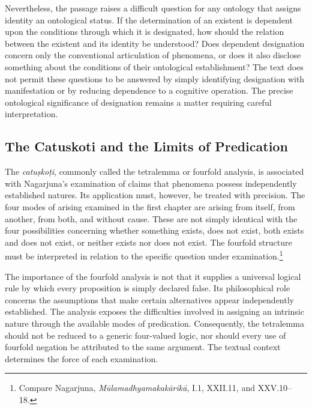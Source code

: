 
\label{para:VS.B01.P01.C08.S18.SS10.P002}
Nevertheless, the passage raises a difficult question for any ontology that assigns identity an ontological status. If the determination of an existent is dependent upon the conditions through which it is designated, how should the relation between the existent and its identity be understood? Does dependent designation concern only the conventional articulation of phenomena, or does it also disclose something about the conditions of their ontological establishment? The text does not permit these questions to be answered by simply identifying designation with manifestation or by reducing dependence to a cognitive operation. The precise ontological significance of designation remains a matter requiring careful interpretation.

\subsection{The Catuskoti and the Limits of Predication}
\label{subsec:ch08_s18_ss11}

\label{para:VS.B01.P01.C08.S18.SS11.P001}
The \emph{catu\d{s}ko\d{t}i}, commonly called the tetralemma or fourfold analysis, is associated with Nagarjuna's examination of claims that phenomena possess independently established natures. Its application must, however, be treated with precision. The four modes of arising examined in the first chapter are arising from itself, from another, from both, and without cause. These are not simply identical with the four possibilities concerning whether something exists, does not exist, both exists and does not exist, or neither exists nor does not exist. The fourfold structure must be interpreted in relation to the specific question under examination.\footnote{Compare Nagarjuna, \emph{M\={u}lamadhyamakak\={a}rik\={a}}, I.1, XXII.11, and XXV.10--18.}


\label{para:VS.B01.P01.C08.S18.SS11.P002}
The importance of the fourfold analysis is not that it supplies a universal logical rule by which every proposition is simply declared false. Its philosophical role concerns the assumptions that make certain alternatives appear independently established. The analysis exposes the difficulties involved in assigning an intrinsic nature through the available modes of predication. Consequently, the tetralemma should not be reduced to a generic four-valued logic, nor should every use of fourfold negation be attributed to the same argument. The textual context determines the force of each examination.


